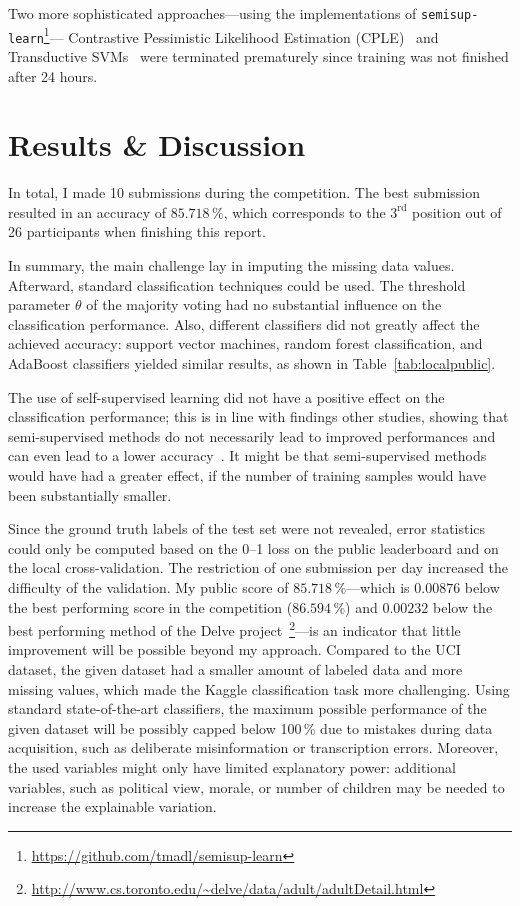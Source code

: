 \documentclass[a4paper,11pt]{article}
\begin{document}
Two more sophisticated approaches---using the implementations of
\texttt{semisup-learn}\footnote{\url{https://github.com/tmadl/semisup-learn}}---
Contrastive Pessimistic Likelihood Estimation
(CPLE)~\cite{loog2016contrastive} and Transductive
SVMs~\cite{bennett1999semi,gieseke2014fast} were terminated
prematurely since training was not finished after 24 hours.

\section{Results \& Discussion}
\label{sec:results}

In total, I made 10 submissions during the competition. The best
submission resulted in an accuracy of $85.718\,\%$, which corresponds
to the $3^{\text{rd}}$ position out of 26 participants when
finishing this report.

In summary, the main challenge lay in imputing the missing data
values. Afterward, standard classification techniques could be
used. The threshold parameter $\theta$ of the majority voting had no
substantial influence on the classification performance. Also,
different classifiers did not greatly affect the achieved accuracy:
support vector machines, random forest classification, and AdaBoost
classifiers yielded similar results, as shown in
Table~\ref{tab:localpublic}.

The use of self-supervised learning did not have a positive effect on
the classification performance; this is in line with findings other
studies, showing that semi-supervised methods do not necessarily lead
to improved performances and can even lead to a lower
accuracy~\cite{zhu2005semi}. It might be that semi-supervised methods
would have had a greater effect, if the number of training samples
would have been substantially smaller. 

Since the ground truth labels of the test set were not revealed, error
statistics could only be computed based on the 0--1 loss on the public
leaderboard and on the local cross-validation. The restriction of one
submission per day increased the difficulty of the validation. My
public score of $85.718\,\%$---which is $0.00876$ below the best
performing score in the competition ($86.594\,\%$) and $0.00232$ below
the best performing method of the Delve
project~\footnote{\url{http://www.cs.toronto.edu/~delve/data/adult/adultDetail.html}}---is
an indicator that little improvement will be possible beyond my
approach. Compared to the UCI dataset, the given dataset had a smaller
amount of labeled data and more missing values, which made the Kaggle
classification task more challenging. Using standard state-of-the-art
classifiers, the maximum possible performance of the given dataset
will be possibly capped below 100\,\% due to mistakes during data
acquisition, such as deliberate misinformation or transcription
errors. Moreover, the used variables might only have limited
explanatory power: additional variables, such as political view,
morale, or number of children may be needed to increase the
explainable variation.
\end{document}
